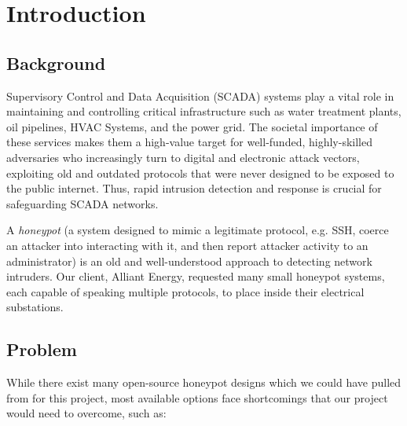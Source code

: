 \section*{\color{NavyBlue}Introduction}
\large

\subsection*{Background}

Supervisory Control and Data Acquisition (SCADA) systems play a vital role in
maintaining and controlling critical infrastructure such as
water treatment plants, oil pipelines, HVAC Systems, and the power grid.
The societal importance of these services makes them a high-value target
for well-funded, highly-skilled adversaries who increasingly turn to digital
and electronic attack vectors, exploiting old and outdated protocols that
were never designed to be exposed to the public internet.
Thus, rapid intrusion detection and response is crucial for safeguarding
SCADA networks.

A \textit{honeypot} (a system designed to mimic a legitimate protocol, e.g.
SSH, coerce an attacker into interacting with it, and then report attacker
activity  to an administrator) is an old and well-understood approach to
detecting network intruders. Our client, Alliant Energy, requested many
small honeypot systems, each capable of speaking multiple protocols, to place
inside their electrical substations.

\subsection*{Problem}
While there exist many open-source honeypot designs which we could have pulled from for this project, most available options face shortcomings that our project would need to overcome, such as:

